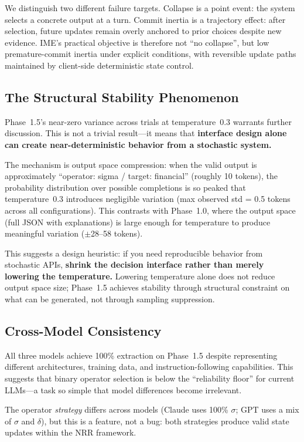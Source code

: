 \documentclass[11pt,a4paper]{article}
\begin{document}
We distinguish two different failure targets. Collapse is a point event:
the system selects a concrete output at a turn. Commit inertia is a trajectory
effect: after selection, future updates remain overly anchored to prior choices
despite new evidence. IME's practical objective is therefore not ``no collapse'',
but low premature-commit inertia under explicit conditions, with reversible
update paths maintained by client-side deterministic state control.

\subsection{The Structural Stability Phenomenon}

Phase~1.5's near-zero variance across trials at temperature~0.3 warrants further
discussion. This is not a trivial result---it means that \textbf{interface
design alone can create near-deterministic behavior from a stochastic system.}

The mechanism is output space compression: when the valid output is approximately
``operator: sigma / target: financial'' (roughly 10 tokens), the probability
distribution over possible completions is so peaked that temperature~0.3
introduces negligible variation (max observed std = 0.5 tokens across all
configurations). This contrasts with Phase~1.0, where the
output space (full JSON with explanations) is large enough for temperature to
produce meaningful variation ($\pm$28--58 tokens).

This suggests a design heuristic: if you need reproducible behavior from
stochastic APIs, \textbf{shrink the decision interface rather than merely
lowering the temperature.} Lowering temperature alone does not reduce output
space size; Phase~1.5 achieves stability through structural constraint on what
can be generated, not through sampling suppression.

\subsection{Cross-Model Consistency}

All three models achieve 100\% extraction on Phase~1.5 despite representing
different architectures, training data, and instruction-following capabilities.
This suggests that binary operator selection is below the ``reliability floor''
for current LLMs---a task so simple that model differences become irrelevant.

The operator \textit{strategy} differs across models (Claude uses 100\%
$\sigma$; GPT uses a mix of $\sigma$ and $\delta$), but this is a feature,
not a bug: both strategies produce valid state updates within the NRR framework.
\end{document}
